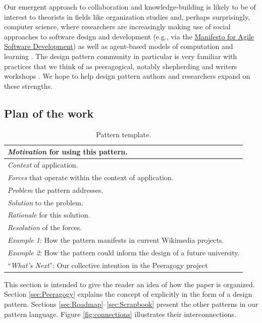 Our emergent approach to collaboration and knowledge-building is likely to be of interest to theorists in fields like organization studies and, perhaps surprisingly, computer science, where researchers are increasingly making use of social approaches to software design and development (e.g., via the \href{http://www.agilemanifesto.org/}{Manifesto for Agile Software Development}) as well as agent-based models of computation and learning \cite{minsky1967programming,poetry-workshop}.  
%
The design pattern community in particular is very familiar with practices that we think of as peeragogical, notably shepherding and writers workshops \cite{harrison1999language,coplien1997pattern}.  We hope to help design pattern authors and researchers expand on these strengths.

\subsection*{Plan of the work}

\begin{table}
\vspace{-.10cm}
\begin{tabular}{|p{}|}
\hline
\emph{Motivation} for using this pattern.\\ \hline
\emph{Context} of application.\\ \hline
\emph{Forces} that operate within the context of application. \\ \hline
\emph{Problem} the pattern addresses.\\ \hline
\emph{Solution} to the problem.\\ \hline
\emph{Rationale} for this solution.\\ \hline
\emph{Resolution} of the forces.\\ \hline
\emph{Example 1}: How the pattern manifests in current Wikimedia projects.\\ \hline
\emph{Example 2}: How the pattern could inform the design of a future university.\\ \hline
``\emph{What's Next}'': Our collective intention in the Peeragogy project\\ \hline
\end{tabular}
\vspace{-.1cm}
\caption{Pattern template.\label{tab:pattern-template}}
\vspace{-.6cm}
\end{table}

This section is intended to give the reader an idea of how the paper is organized. Section \ref{sec:Peeragogy} explains the concept of  explicitly in the form of a design pattern. Sections \ref{sec:Roadmap}--\ref{sec:Scrapbook} present the other patterns in our pattern language. Figure \ref{fig:connections} illustrates their interconnections.

